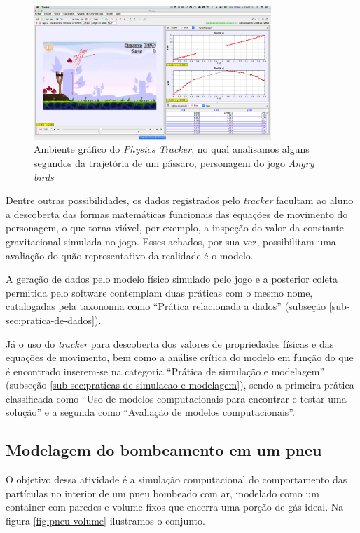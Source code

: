 \begin{figure}[!htb]
  \caption{Ambiente gráfico do \textit{Physics Tracker}, no qual analisamos alguns segundos da trajetória de um pássaro, personagem do jogo \textit{Angry birds}}
  \begin{center}
    \includegraphics[width=0.8\textwidth]{imagens/physics-tracker}
  \end{center}
  \label{fig:physics-tracker}
\end{figure}

Dentre outras possibilidades, os dados registrados pelo \textit{tracker} facultam ao aluno a descoberta das formas matemáticas funcionais das equações de movimento do personagem, o que torna viável, por exemplo, a inspeção do valor da constante gravitacional simulada no jogo. Esses achados, por sua vez, possibilitam uma avaliação do quão representativo da realidade é o modelo. 

A geração de dados pelo modelo físico simulado pelo jogo e a posterior coleta permitida pelo software contemplam duas práticas com o mesmo nome, catalogadas pela taxonomia como ``Prática relacionada a dados'' (subseção \ref{sub-sec:pratica-de-dados}). 

Já o uso do \textit{tracker} para descoberta dos valores de propriedades físicas e das equações de movimento, bem como a análise crítica do modelo em função do que é encontrado inserem-se na categoria ``Prática de simulação e modelagem'' (subseção \ref{sub-sec:praticas-de-simulacao-e-modelagem}), sendo a primeira prática classificada como ``Uso de modelos computacionais para encontrar e testar uma solução''  e a segunda como ``Avaliação de modelos computacionais''.   

\subsection{Modelagem do bombeamento em um pneu}

O objetivo dessa atividade é a simulação computacional do comportamento das partículas no interior de um pneu bombeado com ar, modelado como um container com paredes e volume fixos que encerra uma porção de gás ideal. Na figura \ref{fig:pneu-volume} ilustramos o conjunto.

